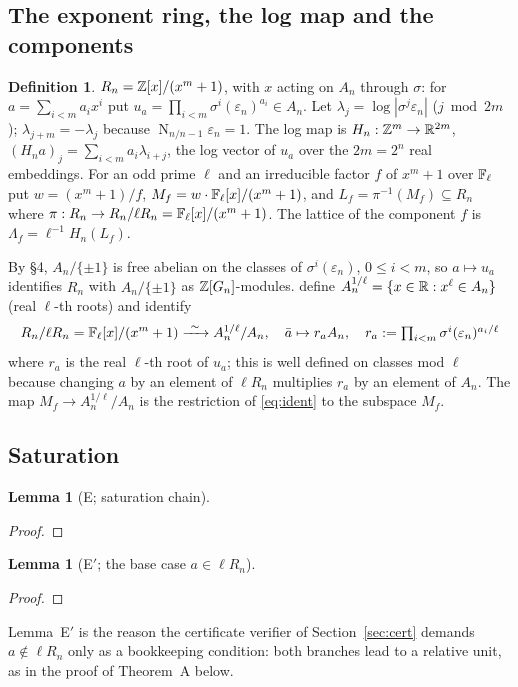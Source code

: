 \documentclass[11pt]{amsart}
\newtheorem{lemma}[theorem]{Lemma}
\theoremstyle{remark}\newtheorem{remark}[theorem]{Remark}
\theoremstyle{definition}\newtheorem{definition}[theorem]{Definition}
\theoremstyle{definition}\newtheorem{algorithm}[theorem]{Algorithm}
\newcommand{\Nr}{\operatorname{N}_{n/n-1}}\newcommand{\covol}{\operatorname{covol}}
\providecommand{\proofsdir}{../../proofs} %
\begin{document}
\subsection{The exponent ring, the log map and the components}
\begin{definition}\label{def:H}
$R_n=\mathbb{Z}[x]/(x^m+1)$, with $x$ acting on $A_n$ through $\sigma$: for $a=\sum_{i<m}a_ix^i$ put $u_a=\prod_{i<m}\sigma^i(\varepsilon_n)^{a_i}\in A_n$. Let $\lambda_j=\log|\sigma^j\varepsilon_n|$ ($j\bmod 2m$); $\lambda_{j+m}=-\lambda_j$ because $\Nr\varepsilon_n=1$. The log map is $H_n:\mathbb{Z}^m\to\mathbb{R}^{2m}$, $(H_na)_j=\sum_{i<m}a_i\lambda_{i+j}$, the log vector of $u_a$ over the $2m=2^n$ real embeddings. For an odd prime $\ell$ and an irreducible factor $f$ of $x^m+1$ over $\mathbb{F}_\ell$ put $w=(x^m+1)/f$, $M_f=w\cdot\mathbb{F}_\ell[x]/(x^m+1)$, and $L_f=\pi^{-1}(M_f)\subseteq R_n$ where $\pi:R_n\to R_n/\ell R_n=\mathbb{F}_\ell[x]/(x^m+1)$. The lattice of the component $f$ is $\Lambda_f=\ell^{-1}H_n(L_f)$.
\end{definition}
By \cite{KY} \S4, $A_n/\{\pm1\}$ is free abelian on the classes of $\sigma^i(\varepsilon_n)$, $0\le i<m$, so $a\mapsto u_a$ identifies $R_n$ with $A_n/\{\pm1\}$ as $\mathbb{Z}[G_n]$-modules. \cite{KY} define $A_n^{1/\ell}=\{x\in\mathbb{R}: x^\ell\in A_n\}$ (real $\ell$-th roots) and identify
\begin{equation}\label{eq:ident}
R_n/\ell R_n=\F_\ell[x]/(x^m+1)\xrightarrow{\ \sim\ }A_n^{1/\ell}/A_n,\quad \bar a\mapsto r_a A_n,\quad r_a:=\textstyle\prod_{i<m}\sigma^i(\varepsilon_n)^{a_i/\ell}
\end{equation}
where $r_a$ is the real $\ell$-th root of $u_a$; this is well defined on classes mod $\ell$ because changing $a$ by an element of $\ell R_n$ multiplies $r_a$ by an element of $A_n$. The map $M_f\to A_n^{1/\ell}/A_n$ is the restriction of \eqref{eq:ident} to the subspace $M_f$.

\subsection{Saturation}\label{sec:sat}
\begin{lemma}[E; saturation chain]\label{lem:E}

\end{lemma}
\begin{proof}

\end{proof}
\begin{lemma}[E$'$; the base case $a\in\ell R_n$]\label{lem:Eprime}

\end{lemma}
\begin{proof}

\end{proof}
Lemma~E$'$ is the reason the certificate verifier of Section~\ref{sec:cert} demands $a\notin\ell R_n$ only as a bookkeeping condition: both branches lead to a relative unit, as in the proof of Theorem~A below.
\end{document}
